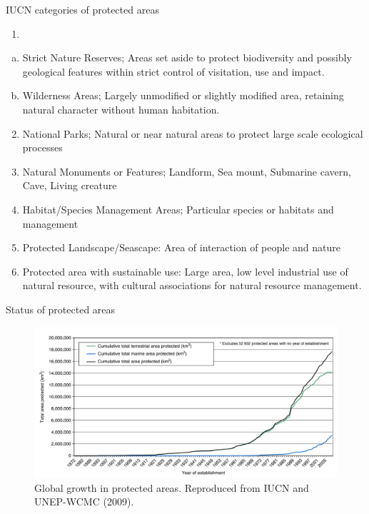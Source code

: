 \documentclass[
  ignorenonframetext,
  aspectratio=169]{beamer}
\providecommand{\tightlist}{%
  \setlength{\itemsep}{0pt}\setlength{\parskip}{0pt}}
\begin{document}
\begin{frame}{IUCN categories of protected areas}
\protect\hypertarget{iucn-categories-of-protected-areas}{}
\begin{enumerate}
\tightlist
\item
\end{enumerate}

\begin{enumerate}
[(a)]
\tightlist
\item
  Strict Nature Reserves; Areas set aside to protect biodiversity and
  possibly geological features within strict control of visitation, use
  and impact.
\item
  Wilderness Areas; Largely unmodified or slightly modified area,
  retaining natural character without human habitation.
\end{enumerate}

\begin{enumerate}
\setcounter{enumi}{1}
\tightlist
\item
  National Parks; Natural or near natural areas to protect large scale
  ecological processes
\item
  Natural Monuments or Features; Landform, Sea mount, Submarine cavern,
  Cave, Living creature
\item
  Habitat/Species Management Areas; Particular species or habitats and
  management
\item
  Protected Landscape/Seascape: Area of interaction of people and nature
\item
  Protected area with sustainable use: Large area, low level industrial
  use of natural resource, with cultural associations for natural
  resource management.
\end{enumerate}
\end{frame}

\begin{frame}{Status of protected areas}
\protect\hypertarget{status-of-protected-areas}{}
\begin{figure}
\includegraphics[width=0.65\linewidth]{./../images/global_protected_area} \caption{Global growth in protected areas. Reproduced from IUCN and UNEP-WCMC (2009).}\label{fig:global}
\end{figure}
\end{frame}
\end{document}
